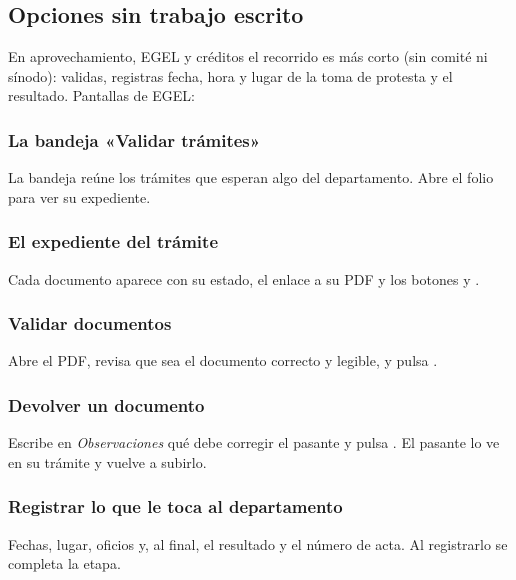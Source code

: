 \subsection{Opciones sin trabajo escrito}
En aprovechamiento, EGEL y créditos el recorrido es más corto (sin comité ni sínodo): validas, registras fecha, hora y lugar de la toma de protesta y el resultado. Pantallas de EGEL:
\subsubsection*{La bandeja «Validar trámites»}
La bandeja reúne los trámites que esperan algo del departamento. Abre el folio para ver su expediente.
\subsubsection*{El expediente del trámite}
Cada documento aparece con su estado, el enlace a su PDF y los botones  y .
\subsubsection*{Validar documentos}
Abre el PDF, revisa que sea el documento correcto y legible, y pulsa .
\subsubsection*{Devolver un documento}
Escribe en \emph{Observaciones} qué debe corregir el pasante y pulsa . El pasante lo ve en su trámite y vuelve a subirlo.
\subsubsection*{Registrar lo que le toca al departamento}
Fechas, lugar, oficios y, al final, el resultado y el número de acta. Al registrarlo se completa la etapa.
